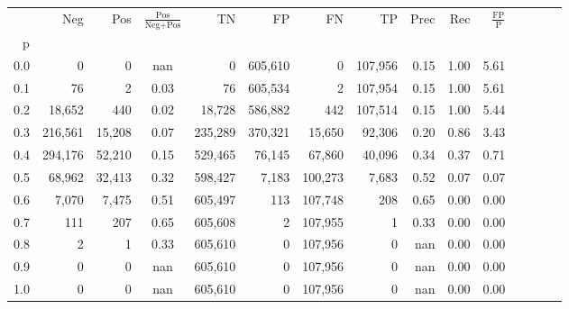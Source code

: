 \begin{tabular}{rrrcrrrrrrrrrrr}
\toprule
{} &      Neg &     Pos & $\frac{\text{Pos}}{\text{Neg}+\text{Pos}}$ &       TN &       FP &       FN &       TP &  Prec &   Rec & $\frac{\text{FP}}{\text{P}}$ \\
p   &          &         &                                            &          &          &          &          &       &       &                              \\
\midrule
0.0 &        0 &       0 &                                        nan &        0 &  605,610 &        0 &  107,956 &  0.15 &  1.00 &                         5.61 \\
0.1 &       76 &       2 &                                       0.03 &       76 &  605,534 &        2 &  107,954 &  0.15 &  1.00 &                         5.61 \\
0.2 &   18,652 &     440 &                                       0.02 &   18,728 &  586,882 &      442 &  107,514 &  0.15 &  1.00 &                         5.44 \\
0.3 &  216,561 &  15,208 &                                       0.07 &  235,289 &  370,321 &   15,650 &   92,306 &  0.20 &  0.86 &                         3.43 \\
0.4 &  294,176 &  52,210 &                                       0.15 &  529,465 &   76,145 &   67,860 &   40,096 &  0.34 &  0.37 &                         0.71 \\
0.5 &   68,962 &  32,413 &                                       0.32 &  598,427 &    7,183 &  100,273 &    7,683 &  0.52 &  0.07 &                         0.07 \\
0.6 &    7,070 &   7,475 &                                       0.51 &  605,497 &      113 &  107,748 &      208 &  0.65 &  0.00 &                         0.00 \\
0.7 &      111 &     207 &                                       0.65 &  605,608 &        2 &  107,955 &        1 &  0.33 &  0.00 &                         0.00 \\
0.8 &        2 &       1 &                                       0.33 &  605,610 &        0 &  107,956 &        0 &   nan &  0.00 &                         0.00 \\
0.9 &        0 &       0 &                                        nan &  605,610 &        0 &  107,956 &        0 &   nan &  0.00 &                         0.00 \\
1.0 &        0 &       0 &                                        nan &  605,610 &        0 &  107,956 &        0 &   nan &  0.00 &                         0.00 \\
\bottomrule
\end{tabular}
